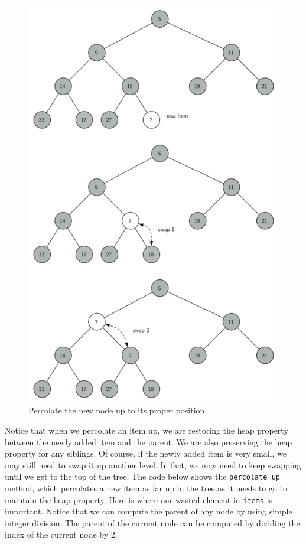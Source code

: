 \documentclass[11pt]{article}
\begin{document}
\begin{figure}
\centering
\includegraphics{figures/percolate-up.png}
\caption{Percolate the new node up to its proper position}
\end{figure}

Notice that when we percolate an item up, we are restoring the heap
property between the newly added item and the parent. We are also
preserving the heap property for any siblings. Of course, if the newly
added item is very small, we may still need to swap it up another level.
In fact, we may need to keep swapping until we get to the top of the
tree. The code below shows the \texttt{percolate\_up} method, which
percolates a new item as far up in the tree as it needs to go to
maintain the heap property. Here is where our wasted element in
\texttt{items} is important. Notice that we can compute the parent of
any node by using simple integer division. The parent of the current
node can be computed by dividing the index of the current node by 2.
\end{document}
